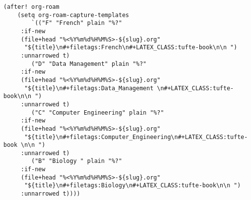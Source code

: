 \documentclass[11pt]{article}
\begin{document}
\begin{verbatim}
(after! org-roam
    (setq org-roam-capture-templates
        `(("F" "French" plain "%?"
     :if-new
     (file+head "%<%Y%m%d%H%M%S>-${slug}.org"
      "${title}\n#+filetags:French\n#+LATEX_CLASS:tufte-book\n\n ")
     :unnarrowed t)
        ("D" "Data Management" plain "%?"
     :if-new
     (file+head "%<%Y%m%d%H%M%S>-${slug}.org"
      "${title}\n#+filetags:Data_Management \n#+LATEX_CLASS:tufte-book\n\n ")
     :unnarrowed t)
        ("C" "Computer Engineering" plain "%?"
     :if-new
     (file+head "%<%Y%m%d%H%M%S>-${slug}.org"
      "${title}\n#+filetags:Computer_Engineering\n#+LATEX_CLASS:tufte-book \n\n ")
     :unnarrowed t)
        ("B" "Biology " plain "%?"
     :if-new
     (file+head "%<%Y%m%d%H%M%S>-${slug}.org"
      "${title}\n#+filetags:Biology\n#+LATEX_CLASS:tufte-book\n\n ")
     :unnarrowed t))))
\end{verbatim}
\end{document}
